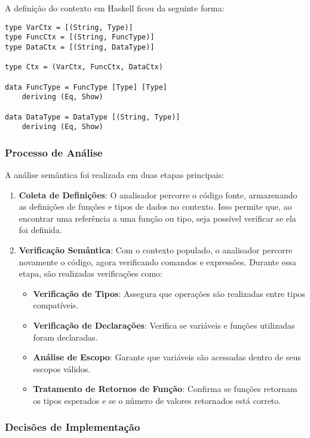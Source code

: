 \documentclass{article}
\begin{document}
A definição do contexto em Haskell ficou da seguinte forma:

\begin{verbatim}
type VarCtx = [(String, Type)]   
type FuncCtx = [(String, FuncType)] 
type DataCtx = [(String, DataType)]
    
type Ctx = (VarCtx, FuncCtx, DataCtx)
    
data FuncType = FuncType [Type] [Type]
    deriving (Eq, Show)
    
data DataType = DataType [(String, Type)]
    deriving (Eq, Show)
\end{verbatim}

\subsubsection{Processo de Análise}

A análise semântica foi realizada em duas etapas principais:

\begin{enumerate}
    \item \textbf{Coleta de Definições}: O analisador percorre o código fonte, armazenando as definições de funções e tipos de dados no contexto. Isso permite que, ao encontrar uma referência a uma função ou tipo, seja possível verificar se ela foi definida.
    
    \item \textbf{Verificação Semântica}: Com o contexto populado, o analisador percorre novamente o código, agora verificando comandos e expressões. Durante essa etapa, são realizadas verificações como:
    \begin{itemize}
        \item \textbf{Verificação de Tipos}: Assegura que operações são realizadas entre tipos compatíveis.
        \item \textbf{Verificação de Declarações}: Verifica se variáveis e funções utilizadas foram declaradas.
        \item \textbf{Análise de Escopo}: Garante que variáveis são acessadas dentro de seus escopos válidos.
        \item \textbf{Tratamento de Retornos de Função}: Confirma se funções retornam os tipos esperados e se o número de valores retornados está correto.
    \end{itemize}
\end{enumerate}

\subsubsection{Decisões de Implementação}
\end{document}
